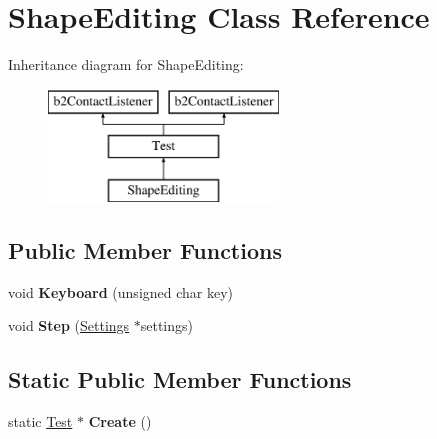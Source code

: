 \hypertarget{class_shape_editing}{\section{Shape\-Editing Class Reference}
\label{class_shape_editing}
}
Inheritance diagram for Shape\-Editing\-:\begin{figure}[H]
\begin{center}
\leavevmode
\includegraphics[height=3.000000cm]{class_shape_editing}
\end{center}
\end{figure}
\subsection*{Public Member Functions}
\begin{DoxyCompactItemize}
\item 
\hypertarget{class_shape_editing_a1e36ec9e86b41ff44ad6458f8aaa1694}{void {\bfseries Keyboard} (unsigned char key)}\label{class_shape_editing_a1e36ec9e86b41ff44ad6458f8aaa1694}

\item 
\hypertarget{class_shape_editing_a354d86a0f31ba2570889db1ada7c8bc1}{void {\bfseries Step} (\hyperlink{struct_settings}{Settings} $\ast$settings)}\label{class_shape_editing_a354d86a0f31ba2570889db1ada7c8bc1}

\end{DoxyCompactItemize}
\subsection*{Static Public Member Functions}
\begin{DoxyCompactItemize}
\item 
\hypertarget{class_shape_editing_ac3c2d45adf4aeb2afc66779bdbacc86c}{static \hyperlink{class_test}{Test} $\ast$ {\bfseries Create} ()}\label{class_shape_editing_ac3c2d45adf4aeb2afc66779bdbacc86c}

\end{DoxyCompactItemize}
